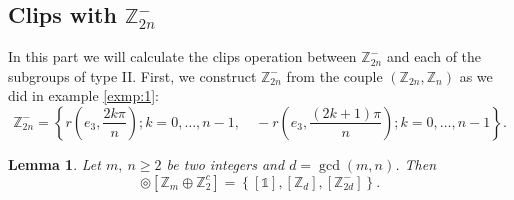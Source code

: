 \documentclass[11pt,a4paper]{amsart}
\newtheorem{lem}[thm]{Lemma}
\theoremstyle{definition}
\newcommand{\ZZ}{\mathbb{Z}}                %
\newcommand{\1}{\mathds{1}}		            %
\newcommand{\set}[1]{\left\{#1\right\}}     %
\begin{document}
\subsection{Clips with $\ZZ_{2n}^-$}
\par In this part we will calculate the clips operation between $\ZZ_{2n}^-$ and each of the subgroups of type II. First, we construct $\ZZ_{2n}^-$ from the couple $(\ZZ_{2n},\ZZ_n)$ as we did in example \ref{exmp:1}:
\begin{equation*}
\ZZ_{2n}^-=\set{r(e_3,\frac{2k\pi}{n});k=0,\dotsc,n-1,\quad -r(e_3,\frac{(2k+1)\pi}{n});k=0,\dotsc,n-1}.
\end{equation*}

\begin{lem}\label{lemma1}
Let $m,\ n \geq 2$ be two integers and $d=\gcd(m,n)$. Then
\begin{equation*}
[\ZZ_{2n}^{-}] \circledcirc [\ZZ_m \oplus \ZZ_2^c]=\set{[\1],[\ZZ_d],[\ZZ_{2d}^-]}.
\end{equation*}
\end{lem}
\end{document}
